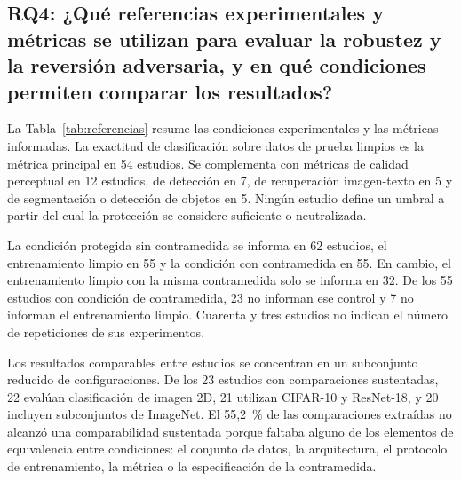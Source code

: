 \subsection{RQ4: ¿Qué referencias experimentales y métricas se utilizan para evaluar la robustez y la reversión adversaria, y en qué condiciones permiten comparar los resultados?}\label{sec:rq4}

La Tabla~\ref{tab:referencias} resume las condiciones experimentales y las métricas informadas. La exactitud de clasificación sobre datos de prueba limpios es la métrica principal en 54 estudios. Se complementa con métricas de calidad perceptual en 12 estudios, de detección en 7, de recuperación imagen-texto en 5 y de segmentación o detección de objetos en 5. Ningún estudio define un umbral a partir del cual la protección se considere suficiente o neutralizada.

La condición protegida sin contramedida se informa en 62 estudios, el entrenamiento limpio en 55 y la condición con contramedida en 55. En cambio, el entrenamiento limpio con la misma contramedida solo se informa en 32. De los 55 estudios con condición de contramedida, 23 no informan ese control y 7 no informan el entrenamiento limpio. Cuarenta y tres estudios no indican el número de repeticiones de sus experimentos.



Los resultados comparables entre estudios se concentran en un subconjunto reducido de configuraciones. De los 23 estudios con comparaciones sustentadas, 22 evalúan clasificación de imagen 2D, 21 utilizan CIFAR-10 y ResNet-18, y 20 incluyen subconjuntos de ImageNet. El 55,2~\% de las comparaciones extraídas no alcanzó una comparabilidad sustentada porque faltaba alguno de los elementos de equivalencia entre condiciones: el conjunto de datos, la arquitectura, el protocolo de entrenamiento, la métrica o la especificación de la contramedida.
